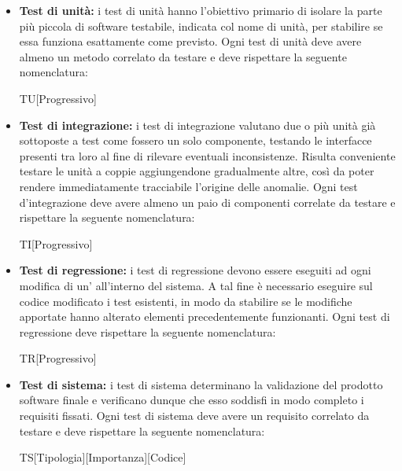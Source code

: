 \documentclass[../NormediProgetto.tex]{subfiles}
\begin{document}
\begin{itemize}
    \item \textbf{Test di unità:} i test di unità hanno l'obiettivo primario di isolare la parte più piccola di software testabile, indicata col nome di unità, per stabilire se essa funziona esattamente come previsto. Ogni test di unità deve avere almeno un metodo correlato da testare e deve rispettare la seguente nomenclatura:
    
    \begin{center}
        TU[Progressivo]
    \end{center}

    \item \textbf{Test di integrazione:} i test di integrazione valutano due o più unità già sottoposte a test come fossero un solo componente, testando le interfacce presenti tra loro al fine di rilevare eventuali inconsistenze. Risulta conveniente testare le unità a coppie aggiungendone gradualmente altre, così da poter rendere immediatamente tracciabile l'origine delle anomalie. Ogni test d'integrazione deve avere almeno un paio di componenti correlate da testare e rispettare la seguente nomenclatura:
    
    \begin{center}
        TI[Progressivo]
    \end{center}
    
    \item \textbf{Test di regressione:} i test di regressione devono essere eseguiti ad ogni modifica di un’ all'interno del sistema. A tal fine è necessario eseguire sul codice modificato i test esistenti, in modo da stabilire se le modifiche apportate hanno alterato elementi precedentemente funzionanti. Ogni test di regressione deve rispettare la seguente nomenclatura:

    \begin{center}
        TR[Progressivo]
    \end{center}
    
    \item \textbf{Test di sistema:} i test di sistema determinano la validazione del prodotto software finale e verificano dunque che esso soddisfi in modo completo i requisiti fissati. Ogni test di sistema deve avere un requisito correlato da testare e deve rispettare la seguente nomenclatura:
    
    \begin{center}
        TS[Tipologia][Importanza][Codice]
    \end{center}


\end{itemize}
\end{document}
